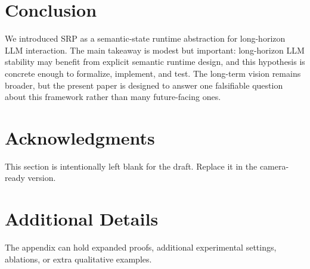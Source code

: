 \documentclass{article}
\begin{document}
\section{Conclusion}
We introduced SRP as a semantic-state runtime abstraction for long-horizon LLM interaction. The main takeaway is modest but important: long-horizon LLM stability may benefit from explicit semantic runtime design, and this hypothesis is concrete enough to formalize, implement, and test. The long-term vision remains broader, but the present paper is designed to answer one falsifiable question about this framework rather than many future-facing ones.

\section*{Acknowledgments}
This section is intentionally left blank for the draft. Replace it in the camera-ready version.

\appendix
\section{Additional Details}
The appendix can hold expanded proofs, additional experimental settings, ablations, or extra qualitative examples.



\end{document}
